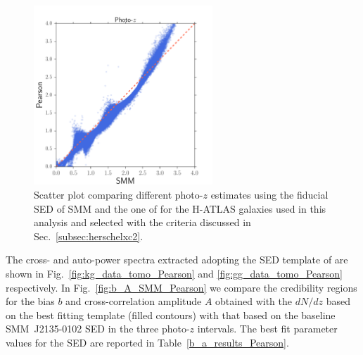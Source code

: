 \begin{figure} %
\centering %
\includegraphics[width=0.6\textwidth]{Chapter4/Images/SMM_vs_Pearson}
\caption{Scatter plot comparing different photo-$z$ estimates using the fiducial \gls{SED} of SMM and the one of \cite{Pearson2013} for the H-ATLAS galaxies used in this analysis and selected with the criteria discussed in Sec.~\eqref{subsec:herschelxc2}. \label{fig:smm_vs_pearson}}
\end{figure}


The cross- and auto-power spectra extracted adopting the \gls{SED} template of \cite{Pearson2013} are shown in Fig.~\eqref{fig:kg_data_tomo_Pearson} and \eqref{fig:gg_data_tomo_Pearson} respectively.
In Fig.~\eqref{fig:b_A_SMM_Pearson} we compare the credibility regions for the bias $b$ and cross-correlation amplitude $A$ obtained with the $dN/dz$ based on the \citet{Pearson2013} best fitting template (filled contours) with that based on the baseline SMM~J2135-0102 SED in the three photo-$z$ intervals. The best fit parameter values for the \citet{Pearson2013} SED are reported in Table~\eqref{b_a_results_Pearson}.


